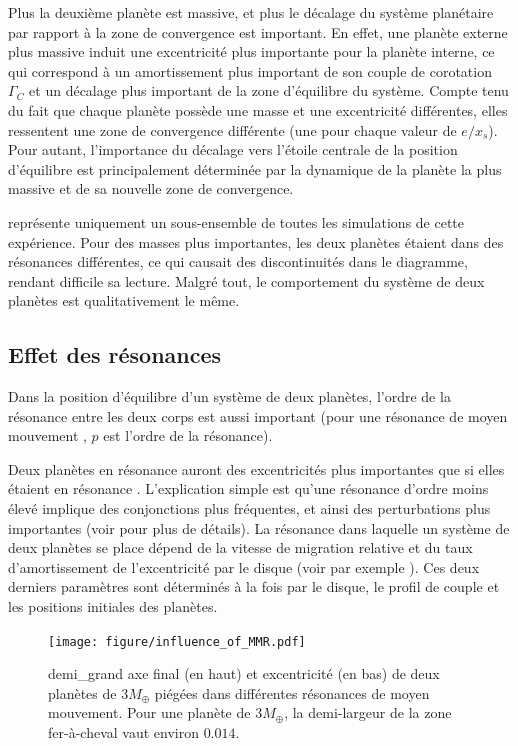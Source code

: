 Plus la deuxième planète est massive, et plus le décalage du système planétaire par rapport à la zone de convergence est important. En effet, une planète externe plus massive induit une excentricité plus importante pour la planète interne, ce qui correspond à un amortissement plus important de son couple de corotation $\Gamma_C$ et un décalage plus important de la zone d'équilibre du système. Compte tenu du fait que chaque planète possède une masse et une excentricité différentes, elles ressentent une zone de convergence différente (une pour chaque valeur de $e/x_s$). Pour autant, l'importance du décalage vers l'étoile centrale de la position d'équilibre est principalement déterminée par la dynamique de la planète la plus massive et de sa nouvelle zone de convergence.

\bigskip

 représente uniquement un sous-ensemble de toutes les simulations de cette expérience. Pour des masses plus importantes, les deux planètes étaient dans des résonances différentes, ce qui causait des discontinuités dans le diagramme, rendant difficile sa lecture. Malgré tout, le comportement du système de deux planètes est qualitativement le même.

\subsection{Effet des résonances}
Dans la position d'équilibre d'un système de deux planètes, l'ordre de la résonance entre les deux corps est aussi important (pour une résonance de moyen mouvement , $p$ est l'ordre de la résonance). 

Deux planètes en résonance  auront des excentricités plus importantes que si elles étaient en résonance . L'explication simple est qu'une résonance d'ordre moins élevé implique des conjonctions plus fréquentes, et ainsi des perturbations plus importantes (voir \cite{murray2000solar} pour plus de détails). La résonance dans laquelle un système de deux planètes se place dépend de la vitesse de migration relative et du taux d'amortissement de l'excentricité par le disque (voir par exemple \cite{mustill2011general}). Ces deux derniers paramètres sont déterminés à la fois par le disque, le profil de couple et les positions initiales des planètes. 

\begin{figure}[htb]
\centering
\texttt{[image: figure/influence\_of\_MMR.pdf]}
\caption{demi_grand axe final (en haut) et excentricité (en bas) de deux planètes de $3\unit{M_\oplus}$ piégées dans différentes résonances de moyen mouvement. Pour une planète de $3\unit{M_\oplus}$, la demi-largeur de la zone fer-à-cheval vaut environ $0.014$.}\label{fig:influence_of_MMR}
\end{figure}

